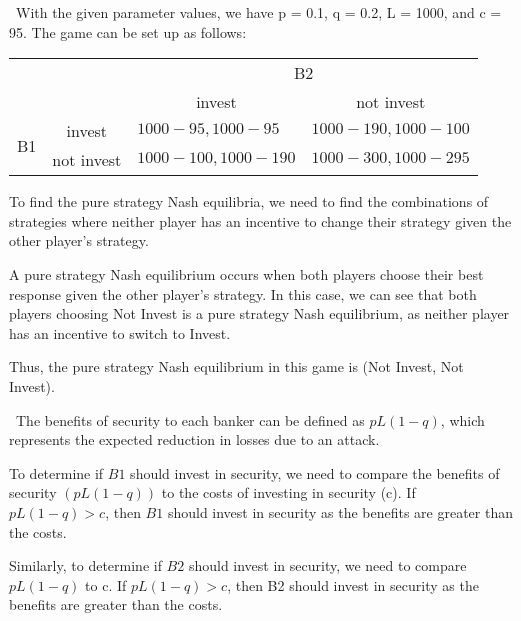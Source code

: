 \documentclass{homework}
\begin{document}
\Definition[4]\ 
With the given parameter values, we have p = 0.1, q = 0.2, L = 1000, and c = 95. The game can be set up as follows:

\begin{table}[h]
\begin{tabular}{llll}
                                           	&                       	& \multicolumn{2}{c}{B2}                                                                                  	\\ \cline{3-4}
                                           	& \multicolumn{1}{l|}{} 	& \multicolumn{1}{c|}{invest}                             	& \multicolumn{1}{c|}{not invest}                             	\\ \cline{2-4}
\multicolumn{1}{c|}{\multirow{2}{*}{B1}} & \multicolumn{1}{c|}{invest}  & \multicolumn{1}{l|}{$1000 - 95, 1000 - 95$}  & \multicolumn{1}{l|}{$1000 - 190, 1000 - 100$}  \\ \cline{2-4}
\multicolumn{1}{c|}{}                      	& \multicolumn{1}{c|}{not invest} & \multicolumn{1}{l|}{$1000 - 100, 1000 - 190$} & \multicolumn{1}{l|}{$1000 - 300, 1000 - 295$} \\ \cline{2-4}
\end{tabular}
\end{table}
To find the pure strategy Nash equilibria, we need to find the combinations of strategies where neither player has an incentive to change their strategy given the other player's strategy.

A pure strategy Nash equilibrium occurs when both players choose their best response given the other player's strategy. In this case, we can see that both players choosing Not Invest is a pure strategy Nash equilibrium, as neither player has an incentive to switch to Invest.

Thus, the pure strategy Nash equilibrium in this game is (Not Invest, Not Invest).


\Definition[5]\ 
The benefits of security to each banker can be defined as $pL(1-q)$, which represents the expected reduction in losses due to an attack.

To determine if $B1$ should invest in security, we need to compare the benefits of security $(pL(1-q))$ to the costs of investing in security (c). If $pL(1-q) > c$, then $B1$ should invest in security as the benefits are greater than the costs.

Similarly, to determine if $B2$ should invest in security, we need to compare $pL(1-q)$ to c. If $pL(1-q) > c$, then B2 should invest in security as the benefits are greater than the costs.
\end{document}
